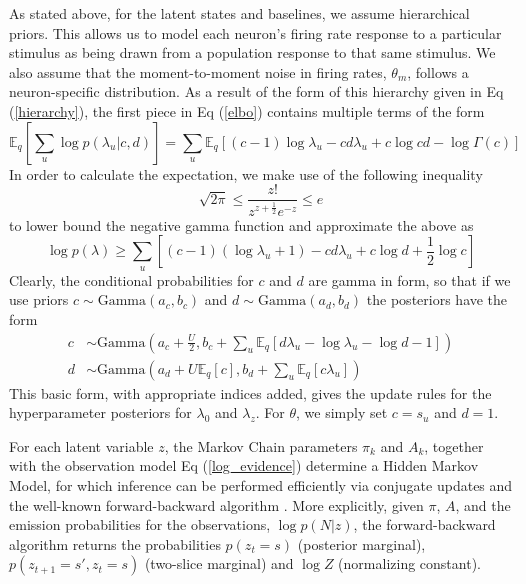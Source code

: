 \documentclass[10pt,letterpaper]{article}
\begin{document}
As stated above, for the latent states and baselines, we assume hierarchical priors. This allows us to model each neuron's firing rate response to a particular stimulus as being drawn from a population response to that same stimulus. We also assume that the moment-to-moment noise in firing rates, $\theta_m$, follows a neuron-specific distribution. As a result of the form of this hierarchy given in Eq (\ref{hierarchy}), the first piece in Eq (\ref{elbo}) contains multiple terms of the form
\begin{equation}
    \mathbb{E}_q \left[\sum_u \log p(\lambda_u|c, d)\right] = \sum_u \mathbb{E}_q \left[
    (c - 1) \log \lambda_u - cd\lambda_u + c \log cd - \log \Gamma(c)
    \right]
\end{equation}
In order to calculate the expectation, we make use of the following inequality \cite{abramowitz1964handbook}
\begin{equation}
    \sqrt{2\pi} \le \frac{z!}{z^{z+\frac{1}{2}} e^{-z}} \le e
\end{equation}
to lower bound the negative gamma function and approximate the above as
\begin{equation}
    \log p(\lambda) \ge \sum_u \left[
    (c - 1) (\log \lambda_u + 1) - cd\lambda_u + c \log d + \frac{1}{2}\log c\right]
\end{equation}
Clearly, the conditional probabilities for $c$ and $d$ are gamma in form, so that if we use priors $c \sim \text{Gamma}(a_c, b_c)$ and $d\sim \text{Gamma}(a_d, b_d)$ the posteriors have the form
\begin{align}
    \label{gammac}
    c &\sim \text{Gamma}\left(a_c + \frac{U}{2},
    b_c + \sum_u\mathbb{E}_q
        \left[d \lambda_u - \log \lambda_u - \log d - 1\right]\right) \\
    \label{gammad}
    d &\sim \text{Gamma}\left(
        a_d + U\mathbb{E}_q[c], b_d + \sum_u \mathbb{E}_q [c \lambda_u]
    \right)
\end{align}
This basic form, with appropriate indices added, gives the update rules for the hyperparameter posteriors for $\lambda_0$ and $\lambda_z$. For $\theta$, we simply set $c = s_u$ and $d = 1$.

For each latent variable $z$, the Markov Chain parameters $\pi_k$ and $A_k$, together with the observation model Eq (\ref{log_evidence}) determine a Hidden Markov Model, for which inference can be performed efficiently via conjugate updates and the well-known forward-backward algorithm \cite{beal2003variational}. More explicitly, given $\pi$, $A$, and the emission probabilities for the observations, $\log p(N|z)$, the forward-backward algorithm returns the probabilities $p(z_t=s)$ (posterior marginal), $p(z_{t+1} =s', z_t=s)$ (two-slice marginal) and $\log Z$ (normalizing constant).
\end{document}
